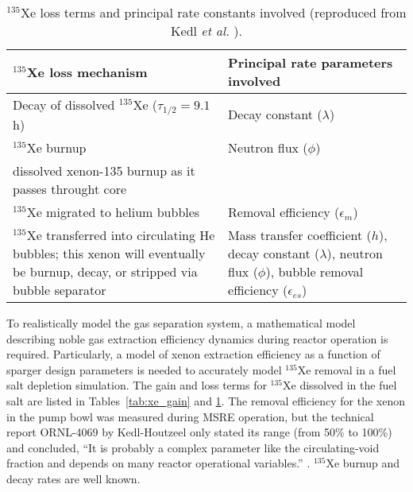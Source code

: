 \begin{table}[b]
	\caption{$^{135}$Xe loss terms and principal rate constants involved
		(reproduced from Kedl \emph{et al.} \cite{kedl_development_1967}).}
	\centering
	\begin{tabularx}{\textwidth}{b b}
		\hline \textbf{$^{135}$Xe loss mechanism}      & \textbf{Principal 
		rate 
			parameters involved}  	\\
		\hline Decay of dissolved $^{135}$Xe ($\tau_{1/2}=9.1$ h)  & Decay 
		constant	($\lambda$)		\\
		\hline $^{135}$Xe burnup              &  Neutron flux 
		($\phi$)		 					\\
		dissolved xenon-135 burnup as it passes throught core  
		& 			            \\		\hline $^{135}$Xe migrated to 
		helium bubbles & Removal efficiency 
		($\epsilon_m$)		\\
		\hline $^{135}$Xe transferred into circulating He bubbles; this xenon 
		will eventually be burnup, decay, or stripped via bubble separator & 
		Mass transfer coefficient ($h$), decay constant ($\lambda$), 
		neutron flux ($\phi$), bubble removal efficiency 
		($\epsilon_{es}$)		\\
		\hline 
	\end{tabularx}
	\label{tab:xe_loss}
\end{table}

To realistically model the gas separation system, a mathematical model 
describing noble gas extraction efficiency dynamics during reactor operation 
is required. Particularly, a model of xenon extraction efficiency as a 
function of sparger design parameters is needed to accurately model 
$^{135}$Xe removal in a fuel salt depletion simulation. The gain and loss 
terms for $^{135}$Xe dissolved in the fuel salt are listed in 
Tables~\ref{tab:xe_gain} and \ref{tab:xe_loss}. The removal efficiency for 
the xenon in the pump bowl was measured during \gls{MSRE} operation, but the  
technical report ORNL-4069 by Kedl-Houtzeel only stated its range (from 50\% 
to 100\%) and concluded, ``It is probably a complex parameter like the 
circulating-void fraction and depends on many reactor operational variables.'' 
\cite{kedl_development_1967}. $^{135}$Xe burnup and decay rates are well 
known. 

